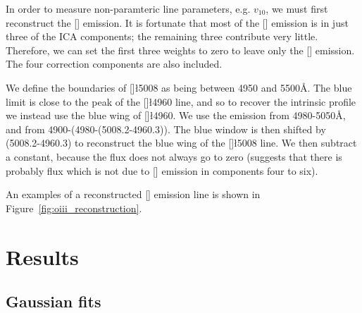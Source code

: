 In order to measure non-paramteric line parameters, e.g. $v_{10}$, we must first reconstruct the [] emission. 
It is fortunate that most of the [] emission is in just three of the \ac{ICA} components; the remaining three contribute very little. 
Therefore, we can set the first three weights to zero to leave only the [] emission. 
The four correction components are also included. 

We define the boundaries of []\l5008 as being between 4950 and 5500\AA. 
The blue limit is close to the peak of the []\l4960 line, and so to recover the intrinsic profile we instead use the blue wing of []\l4960. 
We use the emission from 4980-5050\AA, and from 4900-(4980-(5008.2-4960.3)). 
The blue window is then shifted by (5008.2-4960.3) to reconstruct the blue wing of the []\l5008 line. 
We then subtract a constant, because the flux does not always go to zero (suggests that there is probably flux which is not due to [] emission in components four to six). 

An examples of a reconstructed [] emission line is shown in Figure~\ref{fig:oiii_reconstruction}. 

\section{Results}

\subsection{Gaussian fits}

